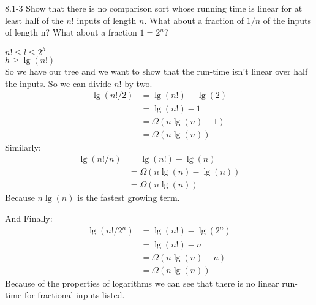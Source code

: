\begin{problem}{8.1-3}
  Show that there is no comparison sort whose running time is linear for at least half of the $n!$ inputs of length $n$.
  What about a fraction of $1/n$ of the inputs of length n? What about a fraction $1=2^n$?
  \begin{solution}
    $n! \le l \le 2^h$ \\
    $h \ge \lg(n!)$
    \vspace{12pt} \\
    So we have our tree and we want to show that the run-time isn't linear over half the inputs. So we can divide $n!$
    by two.
    \begin{align*}
      \lg(n!/2) &= \lg(n!) - \lg(2) \\
      &= \lg(n!) - 1 \\
      &= \Omega(n\lg(n) - 1) \\
      &= \Omega(n\lg(n))
    \end{align*}
    Similarly:
    \vspace{12pt}
    \begin{align*}
      \lg(n!/n) &= \lg(n!) - \lg(n) \\
      &= \Omega(n\lg(n) - \lg(n)) \\
      &= \Omega(n\lg(n))
    \end{align*}
      Because $n\lg(n)$ is the fastest growing term.
      \vspace{12pt}

      \noindent And Finally:
      \begin{align*}
        \lg(n!/2^n) &= \lg(n!) - \lg(2^n) \\
        &= \lg(n!) - n \\
        &= \Omega(n\lg(n) - n) \\
        &= \Omega(n\lg(n))
      \end{align*}
      Because of the properties of logarithms we can see that there is no linear run-time for fractional inputs listed.
  \end{solution}
\end{problem} \newpage

